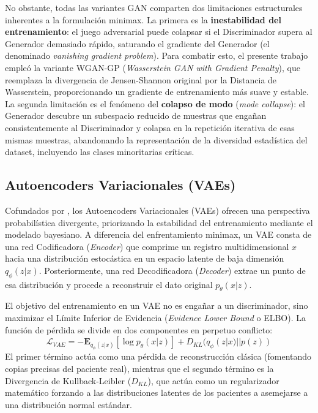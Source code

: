 No obstante, todas las variantes GAN comparten dos limitaciones estructurales inherentes a la formulación minimax. La primera es la \textbf{inestabilidad del entrenamiento}: el juego adversarial puede colapsar si el Discriminador supera al Generador demasiado rápido, saturando el gradiente del Generador (el denominado \textit{vanishing gradient problem}). Para combatir esto, el presente trabajo empleó la variante WGAN-GP (\textit{Wasserstein GAN with Gradient Penalty}), que reemplaza la divergencia de Jensen-Shannon original por la Distancia de Wasserstein, proporcionando un gradiente de entrenamiento más suave y estable. La segunda limitación es el fenómeno del \textbf{colapso de modo} (\textit{mode collapse}): el Generador descubre un subespacio reducido de muestras que engañan consistentemente al Discriminador y colapsa en la repetición iterativa de esas mismas muestras, abandonando la representación de la diversidad estadística del dataset, incluyendo las clases minoritarias críticas.

\subsection{Autoencoders Variacionales (VAEs)}

Cofundados por \textcite{kingma2014vae}, los Autoencoders Variacionales (VAEs) ofrecen una perspectiva probabilística divergente, priorizando la estabilidad del entrenamiento mediante el modelado bayesiano. A diferencia del enfrentamiento minimax, un VAE consta de una red Codificadora (\textit{Encoder}) que comprime un registro multidimensional $x$ hacia una distribución estocástica en un espacio latente de baja dimensión $q_\phi(z|x)$. Posteriormente, una red Decodificadora (\textit{Decoder}) extrae un punto de esa distribución y procede a reconstruir el dato original $p_\theta(x|z)$.

El objetivo del entrenamiento en un VAE no es engañar a un discriminador, sino maximizar el Límite Inferior de Evidencia (\textit{Evidence Lower Bound} o ELBO). La función de pérdida se divide en dos componentes en perpetuo conflicto:
$$ \mathcal{L}_{VAE} = -\mathbf{E}_{q_\phi(z|x)}[\log p_\theta(x|z)] + D_{KL}(q_\phi(z|x) || p(z)) $$
El primer término actúa como una pérdida de reconstrucción clásica (fomentando copias precisas del paciente real), mientras que el segundo término es la Divergencia de Kullback-Leibler ($D_{KL}$), que actúa como un regularizador matemático forzando a las distribuciones latentes de los pacientes a asemejarse a una distribución normal estándar.

